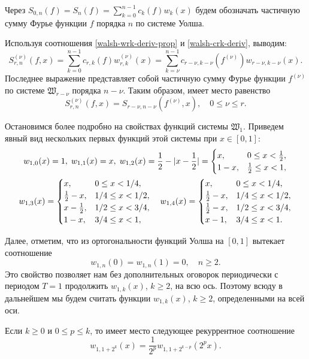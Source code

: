 Через $S_{0,n}(f)=S_n(f)=\sum\limits_{k=0}^{n-1}c_k(f)w_k(x)$ будем обозначать частичную сумму Фурье функции $f$ порядка $n$ по системе Уолша.

Используя соотношения \eqref{walsh-wrk-deriv-prop} и \eqref{walsh-crk-deriv}, выводим:
\begin{equation*}
S_{r,n}^{(\nu)}(f,x)=
\sum_{k=0}^{n-1}c_{r,k}(f)w^{(\nu)}_{r,k}(x)=
\sum_{k=\nu}^{n-1}c_{r-\nu,k-\nu}(f^{(\nu)})w_{r-\nu,k-\nu}(x).
\end{equation*}
Последнее выражение представляет собой частичную сумму Фурье функции $f^{(\nu)}$ по системе $\mathfrak{W}_{r-\nu}$ порядка $n-\nu$. Таким образом, имеет место равенство
\begin{equation}\label{walsh-Srn-deriv}
S_{r,n}^{(\nu)}(f,x)=
S_{r-\nu,n-\nu}(f^{(\nu)},x), \quad 0 \le \nu \le r.
\end{equation}

Остановимся более подробно на свойствах функций системы $\mathfrak{W}_1$.
Приведем явный вид нескольких первых функций этой системы при $x \in [0,1]$:
\begin{gather}\label{walsh-w12}
w_{1,0}(x)=1, \;
w_{1,1}(x)=x, \;
w_{1,2}(x)=\frac{1}{2}-|x-\frac{1}{2}|=
\begin{cases}
x, &0 \le x < \frac{1}{2},\\
1-x, &\frac{1}{2} \le x < 1,
\end{cases}\\
\notag
w_{1,3}(x)=
\begin{cases}
x, &0 \le x < 1/4,\\
\frac{1}{2}-x, &1/4 \le x < 1/2,\\
x-\frac{1}{2}, &1/2 \le x < 3/4,\\
1-x, &3/4 \le x < 1,
\end{cases}
\quad
w_{1,4}(x)=
\begin{cases}
x, &0 \le x < 1/4,\\
\frac{1}{2}-x, &1/4 \le x < 1/2,\\
\frac{1}{2}-x, &1/2 \le x < 3/4,\\
x-1 , &3/4 \le x < 1.
\end{cases}
\end{gather}

Далее, отметим, что из ортогональности функций Уолша на $[0,1]$ вытекает соотношение
\begin{equation*}
w_{1,n}(0)=w_{1,n}(1)=0, \quad n \ge 2.
\end{equation*}
Это свойство позволяет нам без дополнительных оговорок периодически с периодом $T=1$ продолжить $w_{1,k}(x)$, $k \ge 2$, на всю ось. Поэтому
всюду в дальнейшем мы будем считать функции $w_{1,k}(x)$, $k \ge 2$, определенными на всей оси.
\begin{theorem}
	Если $k \ge 0$ и $0 \le p \le k$, то имеет место следующее рекуррентное соотношение
	\begin{equation*}
	w_{1,1+2^k}(x)=\frac{1}{2^p}w_{1,1+2^{k-p}}(2^p x).
	\end{equation*}
\end{theorem}

